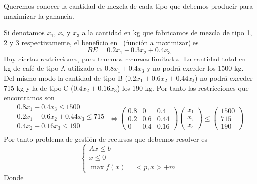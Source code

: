 \documentclass[a4]{article}
\begin{document}
Queremos conocer la cantidad de mezcla de cada tipo que debemos
producir para maximizar la ganancia.

\vspace{4mm}

Si denotamos $x_1$, $x_2$ y $x_3$ a la cantidad en kg que fabricamos
de mezcla de tipo 1, 2 y 3 respectivamente, el beneficio en \EUR\
(función a maximizar) es
\begin{equation} \label{eq:beneficio}
BE=0.2x_1+0.3x_2+0.4x_3
\end{equation}
Hay ciertas restricciones, pues tenemos recursos limitados. La
cantidad total en kg de café de tipo A utilizado es $0.8x_1+0.4x_3$ y
no podrá exceder los 1500 kg. Del mismo modo la cantidad de tipo B
($0.2x_1+0.6x_2+0.44x_3$) no podrá exceder 715 kg y la de tipo C
($0.4x_2+0.16x_3$) los 190 kg. Por tanto las restricciones que
encontramos son
\begin{equation} \label{eq:restricciones}
  \begin{split} 
  0.8x_1+0.4x_3 \leq 1500 \\
  0.2x_1+0.6x_2+0.44x_3 \leq 715 \\
  0.4x_2+0.16x_3 \leq 190 \\
\end{split} \ \Longleftrightarrow
\begin{pmatrix}
    0.8 & 0 & 0.4 \\
    0.2 & 0.6 & 0.44 \\
    0 & 0.4 & 0.16
  \end{pmatrix}
  \begin{pmatrix}
    x_1 \\ x_2 \\ x_3
  \end{pmatrix} \leq
  \begin{pmatrix}
    1500 \\ 715 \\ 190
  \end{pmatrix}
\end{equation}
Por tanto problema de gestión de recursos que debemos resolver es
\begin{equation} \label{eq:prob-recursos}
  \begin{cases}
    Ax\leq b \\
    x\leq 0 \\
    \max f(x)=<p,x>+m
  \end{cases}
\end{equation}
Donde
\end{document}
